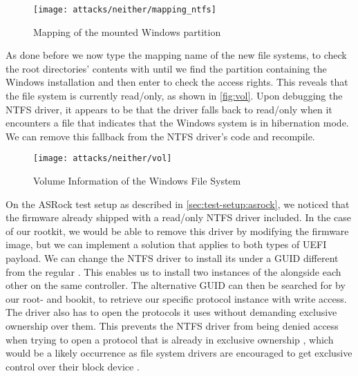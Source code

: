 \begin{figure}[htb]
    \centering
    \texttt{[image: attacks/neither/mapping\_ntfs]}
    \caption{Mapping of the mounted Windows partition}
    \label{fig:mapping-ntfs}
\end{figure}

As done before we now type the mapping name of the new file systems, to check the root directories' contents with  until we find the partition containing the Windows installation and then enter  to check the access rights.
This reveals that the file system is currently read\-/only, as shown in \autoref{fig:vol}.
Upon debugging the \ac{NTFS} driver, it appears to be that the driver falls back to read\-/only when it encounters a file that indicates that the Windows system is in hibernation mode.
We can remove this fallback from the \ac{NTFS} driver's code and recompile.

\begin{figure}[htb]
    \centering
    \texttt{[image: attacks/neither/vol]}
    \caption{Volume Information of the Windows File System}
    \label{fig:vol}
\end{figure}

On the ASRock test setup as described in \autoref{sec:test-setup:asrock}, we noticed that the firmware already shipped with a read\-/only \ac{NTFS} driver included.
In the case of our rootkit, we would be able to remove this driver by modifying the firmware image, but we can implement a solution that applies to both types of \ac{UEFI} payload.
We can change the \ac{NTFS} driver to install its  under a \ac{GUID} different from the regular .
This enables us to install two instances of the  alongside each other on the same controller.
The alternative \ac{GUID} can then be searched for by our root- and bookit, to retrieve our specific protocol instance with write access.
The driver also has to open the protocols it uses without demanding exclusive ownership over them.
This prevents the \ac{NTFS} driver from being denied access when trying to open a protocol that is already in exclusive ownership \cite[Section 7.3]{uefi-spec}, which would be a likely occurrence as file system drivers are encouraged to get exclusive control over their block device \cite[Section 13.5]{uefi-spec}.

